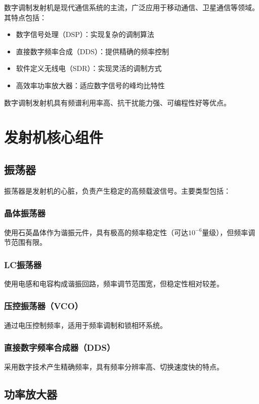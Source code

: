\documentclass[12pt,UTF8]{ctexbook}
\begin{document}
数字调制发射机是现代通信系统的主流，广泛应用于移动通信、卫星通信等领域。其特点包括：

\begin{itemize}[leftmargin=3.5em]
    \item 数字信号处理（DSP）：实现复杂的调制算法
    \item 直接数字频率合成（DDS）：提供精确的频率控制
    \item 软件定义无线电（SDR）：实现灵活的调制方式
    \item 高效率功率放大器：适应数字信号的峰均比特性
\end{itemize}

数字调制发射机具有频谱利用率高、抗干扰能力强、可编程性好等优点。

\section{发射机核心组件}

\subsection{振荡器}

振荡器是发射机的心脏，负责产生稳定的高频载波信号。主要类型包括：

\subsubsection{晶体振荡器}
使用石英晶体作为谐振元件，具有极高的频率稳定性（可达$10^{-6}$量级），但频率调节范围有限。

\subsubsection{LC振荡器}
使用电感和电容构成谐振回路，频率调节范围宽，但稳定性相对较差。

\subsubsection{压控振荡器（VCO）}
通过电压控制频率，适用于频率调制和锁相环系统。

\subsubsection{直接数字频率合成器（DDS）}
采用数字技术产生精确频率，具有频率分辨率高、切换速度快的特点。

\subsection{功率放大器}
\end{document}
